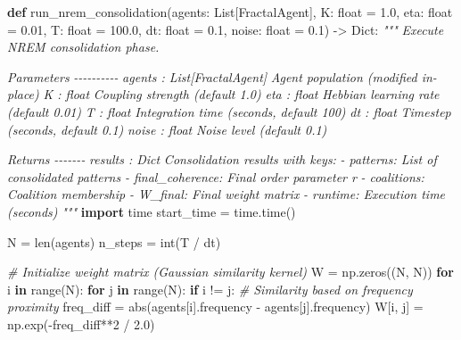 \documentclass[
]{article}
\newenvironment{Shaded}{}{}
\newcommand{\BuiltInTok}[1]{\textcolor[rgb]{0.00,0.50,0.00}{#1}}
\newcommand{\CommentTok}[1]{\textcolor[rgb]{0.38,0.63,0.69}{\textit{#1}}}
\newcommand{\ControlFlowTok}[1]{\textcolor[rgb]{0.00,0.44,0.13}{\textbf{#1}}}
\newcommand{\DecValTok}[1]{\textcolor[rgb]{0.25,0.63,0.44}{#1}}
\newcommand{\FloatTok}[1]{\textcolor[rgb]{0.25,0.63,0.44}{#1}}
\newcommand{\ImportTok}[1]{\textcolor[rgb]{0.00,0.50,0.00}{\textbf{#1}}}
\newcommand{\KeywordTok}[1]{\textcolor[rgb]{0.00,0.44,0.13}{\textbf{#1}}}
\newcommand{\NormalTok}[1]{#1}
\newcommand{\OperatorTok}[1]{\textcolor[rgb]{0.40,0.40,0.40}{#1}}
\begin{document}
\begin{Shaded}
\begin{Highlighting}[]
\KeywordTok{def}\NormalTok{ run\_nrem\_consolidation(agents: List[FractalAgent],}
\NormalTok{                          K: }\BuiltInTok{float} \OperatorTok{=} \FloatTok{1.0}\NormalTok{,}
\NormalTok{                          eta: }\BuiltInTok{float} \OperatorTok{=} \FloatTok{0.01}\NormalTok{,}
\NormalTok{                          T: }\BuiltInTok{float} \OperatorTok{=} \FloatTok{100.0}\NormalTok{,}
\NormalTok{                          dt: }\BuiltInTok{float} \OperatorTok{=} \FloatTok{0.1}\NormalTok{,}
\NormalTok{                          noise: }\BuiltInTok{float} \OperatorTok{=} \FloatTok{0.1}\NormalTok{) }\OperatorTok{{-}\textgreater{}}\NormalTok{ Dict:}
    \CommentTok{"""}
\CommentTok{    Execute NREM consolidation phase.}

\CommentTok{    Parameters}
\CommentTok{    {-}{-}{-}{-}{-}{-}{-}{-}{-}{-}}
\CommentTok{    agents : List[FractalAgent]}
\CommentTok{        Agent population (modified in{-}place)}
\CommentTok{    K : float}
\CommentTok{        Coupling strength (default 1.0)}
\CommentTok{    eta : float}
\CommentTok{        Hebbian learning rate (default 0.01)}
\CommentTok{    T : float}
\CommentTok{        Integration time (seconds, default 100)}
\CommentTok{    dt : float}
\CommentTok{        Timestep (seconds, default 0.1)}
\CommentTok{    noise : float}
\CommentTok{        Noise level (default 0.1)}

\CommentTok{    Returns}
\CommentTok{    {-}{-}{-}{-}{-}{-}{-}}
\CommentTok{    results : Dict}
\CommentTok{        Consolidation results with keys:}
\CommentTok{        {-} patterns: List of consolidated patterns}
\CommentTok{        {-} final\_coherence: Final order parameter r}
\CommentTok{        {-} coalitions: Coalition membership}
\CommentTok{        {-} W\_final: Final weight matrix}
\CommentTok{        {-} runtime: Execution time (seconds)}
\CommentTok{    """}
    \ImportTok{import}\NormalTok{ time}
\NormalTok{    start\_time }\OperatorTok{=}\NormalTok{ time.time()}

\NormalTok{    N }\OperatorTok{=} \BuiltInTok{len}\NormalTok{(agents)}
\NormalTok{    n\_steps }\OperatorTok{=} \BuiltInTok{int}\NormalTok{(T }\OperatorTok{/}\NormalTok{ dt)}

    \CommentTok{\# Initialize weight matrix (Gaussian similarity kernel)}
\NormalTok{    W }\OperatorTok{=}\NormalTok{ np.zeros((N, N))}
    \ControlFlowTok{for}\NormalTok{ i }\KeywordTok{in} \BuiltInTok{range}\NormalTok{(N):}
        \ControlFlowTok{for}\NormalTok{ j }\KeywordTok{in} \BuiltInTok{range}\NormalTok{(N):}
            \ControlFlowTok{if}\NormalTok{ i }\OperatorTok{!=}\NormalTok{ j:}
                \CommentTok{\# Similarity based on frequency proximity}
\NormalTok{                freq\_diff }\OperatorTok{=} \BuiltInTok{abs}\NormalTok{(agents[i].frequency }\OperatorTok{{-}}\NormalTok{ agents[j].frequency)}
\NormalTok{                W[i, j] }\OperatorTok{=}\NormalTok{ np.exp(}\OperatorTok{{-}}\NormalTok{freq\_diff}\OperatorTok{**}\DecValTok{2} \OperatorTok{/} \FloatTok{2.0}\NormalTok{)}


\end{Highlighting}
\end{Shaded}
\end{document}
